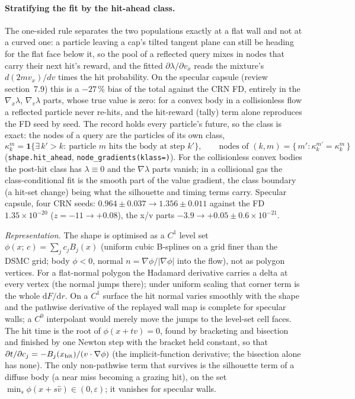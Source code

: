 \documentclass[11pt,a4paper]{article}
\numberwithin{equation}{section}
\newcommand{\code}[1]{\texttt{#1}}
\begin{document}
\paragraph{Stratifying the fit by the hit-ahead class.}
The one-sided rule separates the two populations exactly at a flat wall and not at a
curved one: a particle leaving a cap's tilted tangent plane can still be heading for the
flat face below it, so the pool of a reflected query mixes in nodes that carry their
next hit's reward, and the fitted $\partial\lambda/\partial v_x$ reads the mixture's
$d(2 m v_x)/dv$ times the hit probability.  On the specular capsule (review
section~7.9) this is a $-27\,\%$ bias of the total against the CRN FD, entirely in the
$\nabla_x\lambda$, $\nabla_v\lambda$ parts, whose true value is zero: for a convex body
in a collisionless flow a reflected particle never re-hits, and the hit-reward (tally)
term alone reproduces the FD seed by seed.  The record holds every particle's future,
so the class is exact: the nodes of a query are the particles of its own class,
\begin{equation}
\label{eq:hit-ahead}
\kappa_k^m = \mathbf 1\{\exists\, k' > k:\ \text{particle } m \text{ hits the body at
step } k'\},
\qquad \text{nodes of } (k, m) = \{\,m' : \kappa_k^{m'} = \kappa_k^m\,\}
\end{equation}
(\code{shape.hit\_ahead}, \code{node\_gradients(klass=)}).  For the collisionless
convex bodies the post-hit class has $\lambda \equiv 0$ and the $\nabla\lambda$ parts
vanish; in a collisional gas the class-conditional fit is the smooth part of the value
gradient, the class boundary (a hit-set change) being what the silhouette and timing
terms carry.  Specular capsule, four CRN seeds: $0.964 \pm 0.037 \to 1.356 \pm 0.011$
against the FD $1.35 \times 10^{-20}$ ($z = -11 \to +0.08$), the x/v parts
$-3.9 \to +0.05 \pm 0.6 \times 10^{-21}$.

\emph{Representation.} The shape is optimised as a $C^1$ level set
$\phi(x;\,c) = \sum_j c_j B_j(x)$ (uniform cubic B-splines on a grid finer than the
DSMC grid; body $\phi<0$, normal $n=\nabla\phi/|\nabla\phi|$ into the flow), not as
polygon vertices.  For a flat-normal polygon the Hadamard derivative carries a delta at
every vertex (the normal jumps there); under uniform scaling that corner term is the
whole $\mathrm dF/\mathrm dr$.  On a $C^1$ surface the hit normal varies smoothly with
the shape and the pathwise derivative of the replayed wall map is complete for specular
walls; a $C^0$ interpolant would merely move the jumps to the level-set cell faces.  The
hit time is the root of $\phi(x+tv)=0$, found by bracketing and bisection and finished by
one Newton step with the bracket held constant, so that
$\partial t/\partial c_j = -B_j(x_{\rm hit})/(v\cdot\nabla\phi)$ (the implicit-function
derivative; the bisection alone has none).  The only non-pathwise term that survives is
the silhouette term of a diffuse body (a near miss becoming a grazing hit), on the set
$\min_s \phi(x+s\hat v)\in(0,\varepsilon)$; it vanishes for specular walls.
\end{document}
